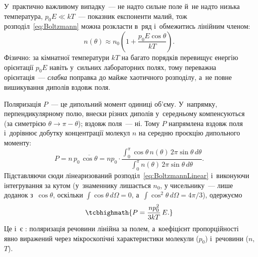 У~практично важливому випадку~--- не надто сильне поле й~не надто низька температура,
$p_0E \ll kT$~--- показник експоненти малий, тож розподіл~\eqref{eq:Boltzmann} можна
розкласти в~ряд і~обмежитись лінійним членом:
\begin{equation}\label{eq:BoltzmannLinear}
	n(\theta) \approx n_0\left(1 + \frac{p_0 E \cos\theta}{kT}\right).
\end{equation}
Фізично: за кімнатної температури $kT$ на багато порядків перевищує енергію орієнтації
$p_0E$ навіть у~сильних лабораторних полях, тому переважна орієнтація~--- \emph{слабка}
поправка до майже хаотичного розподілу, а~не повне вишикування диполів вздовж поля.

Поляризація $P$~--- це дипольний момент одиниці об'єму. У~напрямку, перпендикулярному
полю, внески різних диполів у~середньому компенсуються (за симетрією
$\theta\to\pi-\theta$); вздовж поля~--- ні. Тому $P$ напрямлена вздовж поля і~дорівнює
добутку концентрації молекул $n$ на середню проєкцію дипольного моменту:
\begin{equation*}
	P = n\, p_0\, \overline{\cos\theta} = n p_0 \cdot \frac{\displaystyle\int_0^\pi \cos\theta \, n(\theta)\, 2\pi\sin\theta\, d\theta}
	{\displaystyle\int_0^\pi n(\theta)\, 2\pi\sin\theta\, d\theta}.
\end{equation*}
Підставляючи сюди лінеаризований розподіл~\eqref{eq:BoltzmannLinear} і~виконуючи
інтегрування за кутом (у~знаменнику лишається $n_0$, у чисельнику~--- лише доданок
з~$\cos\theta$, оскільки $\int\cos\theta\,d\Omega=0$, а~$\int\cos^2\theta\,d\Omega =
	4\pi/3$), одержуємо
\begin{equation}\label{eq:LangevinDebye}
	\tcbhighmath{
		P = \frac{n p_0^2}{3kT}\, E.
	}
\end{equation}
Це і~є : поляризація речовини лінійна за полем, а~коефіцієнт
пропорційності явно виражений через мікроскопічні характеристики молекули ($p_0$)
і~речовини ($n$, $T$).

